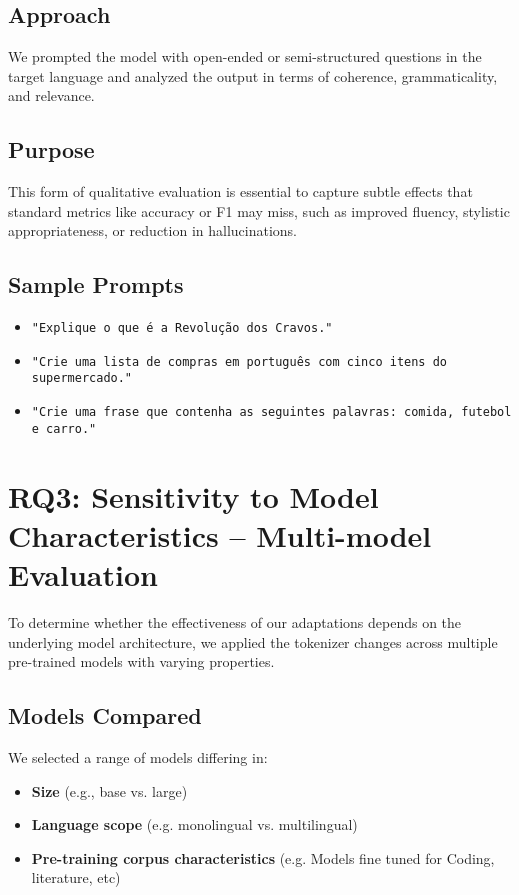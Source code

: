 \subsection{Approach}
We prompted the model with open-ended or semi-structured questions in the target language and analyzed the output in terms of coherence, grammaticality, and relevance.

\subsection{Purpose}
This form of qualitative evaluation is essential to capture subtle effects that standard metrics like accuracy or F1 may miss, such as improved fluency, stylistic appropriateness, or reduction in hallucinations.

\subsection{Sample Prompts}
\begin{itemize}
    \item \texttt{"Explique o que é a Revolução dos Cravos."}
    \item \texttt{"Crie uma lista de compras em português com cinco itens do supermercado."}
    \item \texttt{"Crie uma frase que contenha as seguintes palavras: comida, futebol e carro."}
\end{itemize}



\section{RQ3: Sensitivity to Model Characteristics – Multi-model Evaluation}
\label{sec:model_variation}

To determine whether the effectiveness of our adaptations depends on the underlying model architecture, we applied the tokenizer changes across multiple pre-trained models with varying properties.

\subsection{Models Compared}
We selected a range of models differing in:
\begin{itemize}
    \item \textbf{Size} (e.g., base vs. large)
    \item \textbf{Language scope} (e.g. monolingual vs. multilingual)
    \item \textbf{Pre-training corpus characteristics} (e.g. Models fine tuned for Coding, literature, etc)
\end{itemize}

